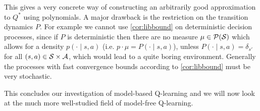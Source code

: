 This gives a very concrete way of constructing an arbitrarily good
approximation to $Q^*$ using polynomials.
A major drawback is the restriction on the transition dynamics $P$.
For example we cannot use \cref{cor:libbound} on deterministic
decision processes, since if $P$ is deterministic then there
are no measure $\mu \in \mathcal{P}(\mathcal{S})$ which allows for a
density $p(\cdot \mid s, a)$ (i.e. $p \cdot \mu = P(\cdot \mid s, a)$),
unless $P(\cdot \mid s, a) = \delta_{s'}$ for all $(s, a) \in \mathcal{S} \times
\mathcal{A}$, which would lead to a quite boring environment.
Generally the processes with fast convergence bounds 
according to \cref{cor:libbound} must be very stochastic.

This concludes our investigation of model-based Q-learning and we will
now look at the much more well-studied field of model-free Q-learning.

